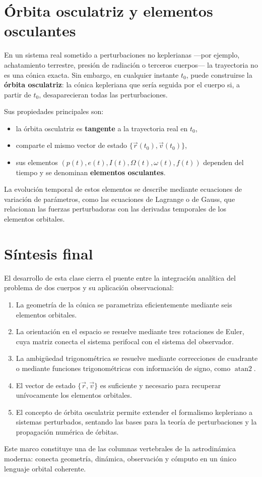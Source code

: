 \section{Órbita osculatriz y elementos osculantes}
En un sistema real sometido a perturbaciones no keplerianas —por ejemplo, achatamiento terrestre, presión de radiación o terceros cuerpos— la trayectoria no es una cónica exacta. Sin embargo, en cualquier instante \(t_0\), puede construirse la \textbf{órbita osculatriz}: la cónica kepleriana que sería seguida por el cuerpo si, a partir de \(t_0\), desaparecieran todas las perturbaciones.

Sus propiedades principales son:
\begin{itemize}
    \item la órbita osculatriz es \textbf{tangente} a la trayectoria real en \(t_0\),
    \item comparte el mismo vector de estado \(\{\vec{r}(t_0),\vec{v}(t_0)\}\),
    \item sus elementos \((p(t), e(t), I(t), \Omega(t), \omega(t), f(t))\) dependen del tiempo y se denominan \textbf{elementos osculantes}.
\end{itemize}

La evolución temporal de estos elementos se describe mediante ecuaciones de variación de parámetros, como las ecuaciones de Lagrange o de Gauss, que relacionan las fuerzas perturbadoras con las derivadas temporales de los elementos orbitales.

\section{Síntesis final}
El desarrollo de esta clase cierra el puente entre la integración analítica del problema de dos cuerpos y su aplicación observacional:
\begin{enumerate}
    \item La geometría de la cónica se parametriza eficientemente mediante seis elementos orbitales.
    \item La orientación en el espacio se resuelve mediante tres rotaciones de Euler, cuya matriz conecta el sistema perifocal con el sistema del observador.
    \item La ambigüedad trigonométrica se resuelve mediante correcciones de cuadrante o mediante funciones trigonométricas con información de signo, como \(\operatorname{atan2}\).
    \item El vector de estado \(\{\vec{r},\vec{v}\}\) es suficiente y necesario para recuperar unívocamente los elementos orbitales.
    \item El concepto de órbita osculatriz permite extender el formalismo kepleriano a sistemas perturbados, sentando las bases para la teoría de perturbaciones y la propagación numérica de órbitas.
\end{enumerate}

\begin{importante}
Este marco constituye una de las columnas vertebrales de la astrodinámica moderna: conecta geometría, dinámica, observación y cómputo en un único lenguaje orbital coherente.
\end{importante}